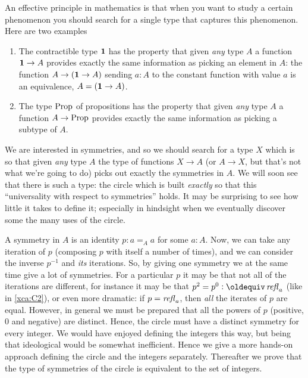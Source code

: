 \newcommand{\covering}{{\color{red}set map}\xspace}
\newcommand{\coverings}{{\color{red}set maps}\xspace}
\newcommand{\Covering}{{\color{red}Set map}\xspace}
\newcommand{\Coverings}{{\color{red}Set maps}\xspace}


\label{cha:circle}

An effective principle in mathematics is that when you want to study a certain 
phenomenon you should search for a single type that captures this phenomenon.  
Here are two examples
\begin{enumerate}
\item The contractible type $\mathbf{1}$ has the property that given 
\emph{any} type $A$ a function $\mathbf{1}\to A$ provides exactly the 
same information as picking an element in $A$: 
the function $A\to (\mathbf{1}\to A)$ sending $a:A$ to the 
constant function with value $a$ is an equivalence, \ie $A=(\mathbf{1}\to A)$.
\item The type $\mathord{\mathrm{Prop}}$ of propositions has the property that 
given \emph{any} type $A$ a function $A\to\mathord{\mathrm{Prop}}$ provides exactly 
the same information as picking a subtype of $A$.
\end{enumerate}
We are interested in symmetries, and so we should search for a type $X$ which is so that given \emph{any} type $A$ the type of functions $X\to A$ (or $A\to X$, but that's not what we're going to do) picks out exactly the symmetries in $A$.  We will soon see that there is such a type: the circle which is built \emph{exactly} so that this ``universality with respect to symmetries'' holds.  It may be surprising to see how little it takes to define it; especially in hindsight when we eventually discover some the many uses of the circle.

A symmetry in $A$ is an identity $p:a=_Aa$ for some $a:A$.  
Now, we can take any iteration of $p$ (composing $p$ with itself a number of times), 
and we can consider the inverse $p^{-1}$ and \emph{its} iterations.  
So, by giving one symmetry we at the same time give a lot of symmetries.  
For a particular $p$ it may be that not all of the iterations are different, 
for instance it may be that $p^2=p^0\defequi\refl a$ (like in \cref{xca:C2}), 
or even more dramatic: if  $p=\mathop{{\it refl}_{a}}$, then \emph{all} the iterates of $p$ are equal. 
However, in general we must be prepared that all the powers of $p$ 
(positive, $0$ and negative) are distinct. 
Hence, the circle must have a distinct symmetry for every integer. 
We would have enjoyed defining the integers this way, 
but being that ideological would be somewhat inefficient. 
Hence we give a more hands-on approach defining the circle 
and the integers separately. Thereafter we prove that the type of 
symmetries of the circle is equivalent to the set of integers. 

